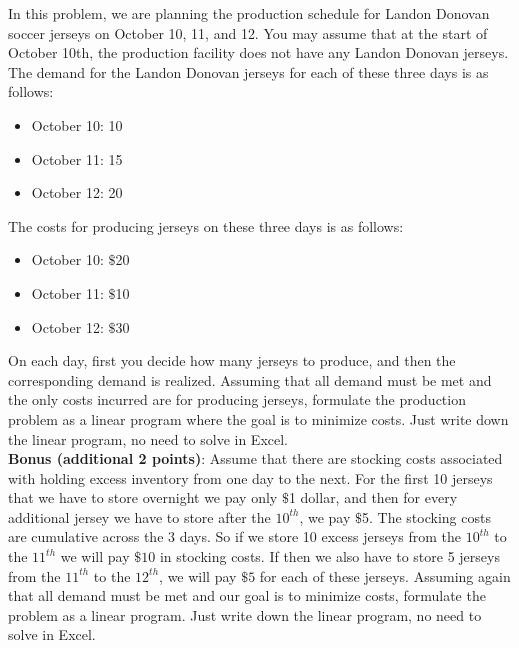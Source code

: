 \documentclass{article}[11 pt]    %
\begin{document}
In this problem, we are planning the production schedule for Landon Donovan soccer jerseys on October 10, 11, and 12.  You may assume that at the start of October 10th, the production facility does not have any Landon Donovan jerseys.  The demand for the Landon Donovan jerseys for each of these three days is as follows:
\begin{itemize}
\item October 10: 10
\item October 11: 15
\item October 12: 20
\end{itemize} 
The costs for producing jerseys on these three days is as follows:
\begin{itemize}
\item October 10: $\$$20  
\item October 11: $\$$10
\item October 12: $\$$30
\end{itemize}
On each day, first you decide how many jerseys to produce, and then the corresponding demand is realized.  Assuming that all demand must be met and the only costs incurred are for producing jerseys, formulate the production problem as a linear program where the goal is to minimize costs.  Just write down the linear program, no need to solve in Excel.
\\

\noindent \textbf{Bonus (additional 2 points)}:  Assume that there are stocking costs associated with holding excess inventory from one day to the next.  For the first 10 jerseys that we have to store overnight we pay only $\$$1 dollar, and then for every additional jersey we have to store after the $10^{th}$, we pay $\$$5. The stocking costs are cumulative across the 3 days.  So if we store 10 excess jerseys from the $10^{th}$ to the $11^{th}$ we will pay $\$10$ in stocking costs.  If then we also have to store 5 jerseys from the $11^{th}$ to the $12^{th}$, we will pay $\$5$ for each of these jerseys.  Assuming again that all demand must be met and our goal is to minimize costs, formulate the problem as a linear program.  Just write down the linear program, no need to solve in Excel.

 
     
\end{document}
